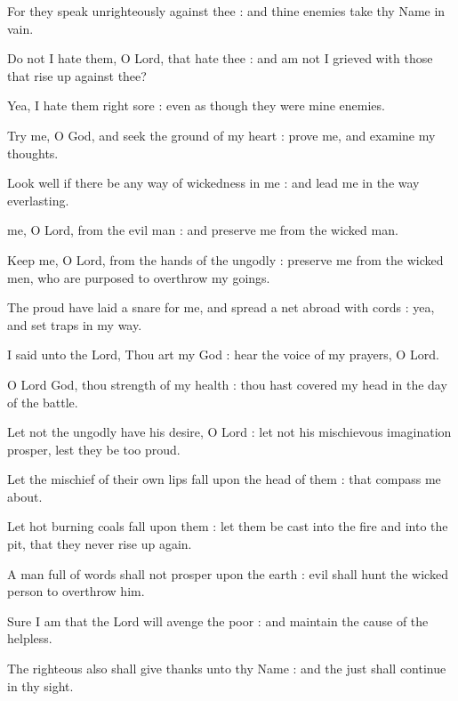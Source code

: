 For they speak unrighteously against thee : and thine enemies take thy Name in vain.\par
{}Do not I hate them, O Lord, that hate thee : and am not I grieved with those that rise up against thee?\par
{}Yea, I hate them right sore : even as though they were mine enemies.\par
{}Try me, O God, and seek the ground of my heart : prove me, and examine my thoughts.\par
{}Look well if there be any way of wickedness in me : and lead me in the way everlasting.\par


 me, O Lord, from the evil man : and preserve me from the wicked man.\par
{}
Keep me, O Lord, from the hands of the ungodly : preserve me from the wicked men, who are purposed to overthrow my goings.\par
{}The proud have laid a snare for me, and spread a net abroad with cords : yea, and set traps in my way.\par
{}I said unto the Lord, Thou art my God : hear the voice of my prayers, O Lord.\par
{}O Lord God, thou strength of my health : thou hast covered my head in the day of the battle.\par
{}Let not the ungodly have his desire, O Lord : let not his mischievous imagination prosper, lest they be too proud.\par
{}Let the mischief of their own lips fall upon the head of them : that compass me about.\par
{}Let hot burning coals fall upon them : let them be cast into the fire and into the pit, that they never rise up again.\par
{}A man full of words shall not prosper upon the earth : evil shall hunt the wicked person to overthrow him.\par
{}Sure I am that the Lord will avenge the poor : and maintain the cause of the helpless.\par
{}The righteous also shall give thanks unto thy Name : and the just shall continue in thy sight.\par

